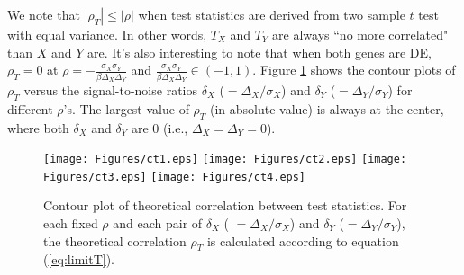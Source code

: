 	We note that $|\rho_T| \leq |\rho|$ when test statistics are derived from two sample $t$ test 
	with equal variance. In other words, $T_X$ and $T_Y$ are always ``no more correlated" than $X$ 
	and $Y$ are. It's also interesting to note that when both genes are DE, $\rho_T=0$ at $\rho 
	=-\frac{\sigma_X\sigma_Y}{\beta\Delta_X\Delta_Y} $ and 
	$\frac{\sigma_X\sigma_Y}{\beta\Delta_X\Delta_Y} \in (-1, 1)$. Figure \ref{fig:ct} shows the 
	contour plots of $\rho_T$ versus the signal-to-noise ratios $\delta_X$ ($=\Delta_X/\sigma_X$) 
	and $\delta_Y$ ($=\Delta_Y/\sigma_Y$) for different $\rho$'s. The largest value of $\rho_T$ (in 
	absolute value) 
	is always at the center, where both $\delta_X$ and $\delta_Y$ are 0 (i.e., $\Delta_X =\Delta_Y 
	= 0$).
	
	\begin{figure}[!ht]
		\centering
		\texttt{[image: Figures/ct1.eps]}
		\texttt{[image: Figures/ct2.eps]}
		\texttt{[image: Figures/ct3.eps]}
		\texttt{[image: Figures/ct4.eps]}
		\caption[Contour plot of theoretical correlation between test statistics.]{Contour plot of 
		theoretical correlation between test statistics. For 
			each fixed $\rho$ and each pair of $\delta_X$ (	$=\Delta_X/\sigma_X$) 
			and $\delta_Y$ ($=\Delta_Y/\sigma_Y$), the theoretical correlation $\rho_T$ is 
			calculated according to equation (\ref{eq:limitT}).}
		\label{fig:ct}
	\end{figure}
	
